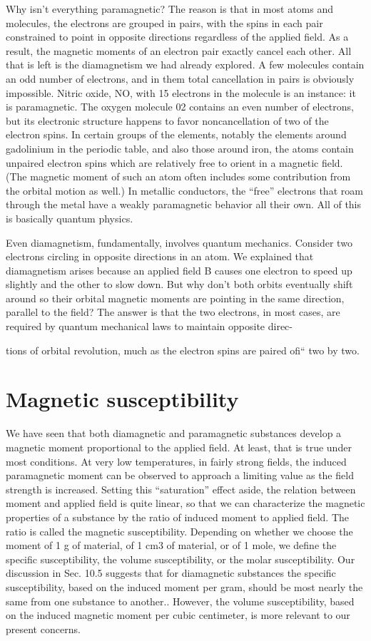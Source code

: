 {Why isn't everything paramagnetic? The reason is that in most
atoms and molecules, the electrons are grouped in pairs, with the
spins in each pair constrained to point in opposite directions regardless
of the applied field. As a result, the magnetic moments of an
electron pair exactly cancel each other. All that is left is the 
diamagnetism we had already explored. A few molecules contain an odd
number of electrons, and in them total cancellation in pairs is obviously
impossible. Nitric oxide, NO, with 15 electrons in the molecule
is an instance: it is paramagnetic. The oxygen molecule 02
contains an even number of electrons, but its electronic structure
happens to favor noncancellation of two of the electron spins. In
certain groups of the elements, notably the elements around gadolinium
in the periodic table, and also those around iron, the atoms
contain unpaired electron spins which are relatively free to orient
in a magnetic field. (The magnetic moment of such an atom often
includes some contribution from the orbital motion as well.) In
metallic conductors, the ``free'' electrons that roam through the metal
have a weakly paramagnetic behavior all their own. All of this is
basically quantum physics.

Even diamagnetism, fundamentally, involves quantum mechanics.
Consider two electrons circling in opposite directions in an atom.
We explained that diamagnetism arises because an applied field B
causes one electron to speed up slightly and the other to slow down.
But why don't both orbits eventually shift around so their orbital
magnetic moments are pointing in the same direction, parallel to
the field? The answer is that the two electrons, in most cases, are
required by quantum mechanical laws to maintain opposite direc-

tions of orbital revolution, much as the electron spins are paired ofi``
two by two.

\section{Magnetic susceptibility}

We have seen that both diamagnetic and paramagnetic substances
develop a magnetic moment proportional to the applied field. At
least, that is true under most conditions. At very low temperatures,
in fairly strong fields, the induced paramagnetic moment can be
observed to approach a limiting value as the field strength is 
increased. Setting this ``saturation'' effect aside, the relation between
moment and applied field is quite linear, so that we can characterize
the magnetic properties of a substance by the ratio of induced
moment to applied field. The ratio is called the magnetic 
susceptibility. Depending on whether we choose the moment of 1 g of
material, of 1 cm3 of material, or of 1 mole, we define the specific
susceptibility, the volume susceptibility, or the molar susceptibility.
Our discussion in Sec. 10.5 suggests that for diamagnetic substances
the specific susceptibility, based on the induced moment per gram,
should be most nearly the same from one substance to another..
However, the volume susceptibility, based on the induced magnetic
moment per cubic centimeter, is more relevant to our present
concerns.

}
